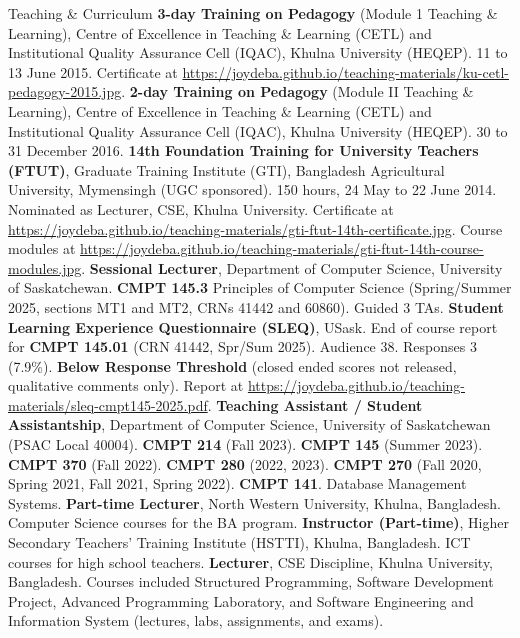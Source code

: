 \begin{rubric}{Teaching \& Curriculum}
\vspace{-1mm}
\entry*[CETL1]%
	\textbf{3-day Training on Pedagogy} (Module 1 Teaching \& Learning), Centre of Excellence in Teaching \& Learning ({CETL}) and Institutional Quality Assurance Cell ({IQAC}), Khulna University (HEQEP). 11 to 13 June 2015.
	Certificate at \url{https://joydeba.github.io/teaching-materials/ku-cetl-pedagogy-2015.jpg}.
\vspace{-1mm}
\entry*[CETL2]%
	\textbf{2-day Training on Pedagogy} (Module II Teaching \& Learning), Centre of Excellence in Teaching \& Learning ({CETL}) and Institutional Quality Assurance Cell ({IQAC}), Khulna University (HEQEP). 30 to 31 December 2016.
\vspace{-1mm}
\entry*[GTI]%
	\textbf{14th Foundation Training for University Teachers (FTUT)}, Graduate Training Institute ({GTI}), Bangladesh Agricultural University, Mymensingh (UGC sponsored). 150 hours, 24 May to 22 June 2014. Nominated as Lecturer, CSE, Khulna University.
	Certificate at \url{https://joydeba.github.io/teaching-materials/gti-ftut-14th-certificate.jpg}.
	Course modules at \url{https://joydeba.github.io/teaching-materials/gti-ftut-14th-course-modules.jpg}.
\vspace{-1mm}
\entry*[2025]%
	\textbf{Sessional Lecturer}, Department of Computer Science, University of Saskatchewan.
	\textbf{CMPT 145.3} Principles of Computer Science (Spring/Summer 2025, sections MT1 and MT2, CRNs 41442 and 60860). Guided 3 TAs.
\vspace{-1mm}
\entry*[SLEQ]%
	\textbf{Student Learning Experience Questionnaire (SLEQ)}, USask. End of course report for \textbf{CMPT 145.01} (CRN 41442, Spr/Sum 2025). Audience 38. Responses 3 (7.9\%). \textbf{Below Response Threshold} (closed ended scores not released, qualitative comments only). Report at \url{https://joydeba.github.io/teaching-materials/sleq-cmpt145-2025.pdf}.
\vspace{-1mm}
\entry*[2017/24]%
	\textbf{Teaching Assistant / Student Assistantship}, Department of Computer Science, University of Saskatchewan (PSAC Local 40004).
	\textbf{CMPT 214} (Fall 2023). \textbf{CMPT 145} (Summer 2023). \textbf{CMPT 370} (Fall 2022). \textbf{CMPT 280} (2022, 2023). \textbf{CMPT 270} (Fall 2020, Spring 2021, Fall 2021, Spring 2022). \textbf{CMPT 141}. Database Management Systems.
\vspace{-1mm}
\entry*[2014/16]%
	\textbf{Part-time Lecturer}, North Western University, Khulna, Bangladesh.
	Computer Science courses for the {BA} program.
\vspace{-1mm}
\entry*[2014/16]%
	\textbf{Instructor (Part-time)}, Higher Secondary Teachers' Training Institute ({HSTTI}), Khulna, Bangladesh.
	ICT courses for high school teachers.
\vspace{-1mm}
\entry*[2013/17]%
	\textbf{Lecturer}, CSE Discipline, Khulna University, Bangladesh.
	Courses included Structured Programming, Software Development Project, Advanced Programming Laboratory, and Software Engineering and Information System (lectures, labs, assignments, and exams).
\end{rubric}
